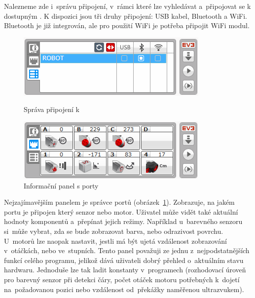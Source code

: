 Nalezneme zde i~správu připojení, v~rámci které lze vyhledávat a~připojovat se k dostupným . 
K dispozici jsou tři druhy připojení: USB kabel, Bluetooth a WiFi. Bluetooth je již integrován, ale pro použití WiFi je potřeba připojit WiFi modul.

\begin{figure}[h]
	\begin{minipage}[b]{.48\textwidth}
		\centering
		\includegraphics[width=\textwidth]{images/lego-soft_brick-manager_connected.png}
		\caption{Správa připojení k }
		\label{fig:lego-soft_brick-manager-connected}
	\end{minipage}
	\hfill
	\begin{minipage}[b]{.48\textwidth}
		\centering
		\includegraphics[width=\textwidth]{images/lego-soft_brick_port-view.png}
		\caption{Informační panel s porty}
		\label{fig:lego-soft_brick_port-view}
	\end{minipage}
\end{figure}

Nejzajímavějším panelem je správce portů (obrázek~\ref{fig:lego-soft_brick_port-view}). 
Zobrazuje, na jakém portu je připojen který senzor nebo motor. 
Uživatel může vidět také aktuální hodnoty komponentů a~přepínat jejich režimy.    
Například u~barevného senzoru si~může vybrat, zda se bude zobrazovat barva, nebo odrazivost povrchu. U~motorů lze naopak nastavit, jestli má být ujetá vzdálenost zobrazování v~otáčkách, nebo ve~stupních. 
Tento panel považuji ze jednu z~nejpodstatnějších funkcí celého programu, jelikož dává uživateli dobrý přehled o~aktuálním stavu hardwaru. 
Jednoduše lze tak ladit konstanty v~programech (rozhodovací úroveň pro barevný senzor při detekci čáry, počet otáček motoru potřebných k~dojetí na~požadovanou pozici nebo vzdálenost od~překážky naměřenou ultrazvukem). 

